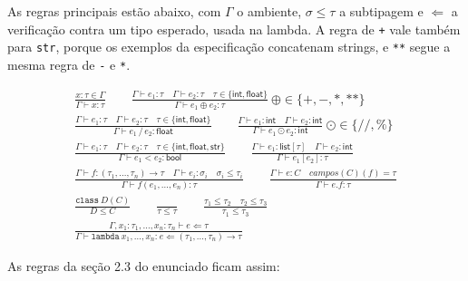 \documentclass[12pt,a4paper]{article}
\newcommand{\ty}[1]{\mathsf{#1}}
\begin{document}
As regras principais estão abaixo, com $\Gamma$ o ambiente,
$\sigma \le \tau$ a subtipagem e $\Leftarrow$ a verificação contra um
tipo esperado, usada na lambda. A regra de \texttt{+} vale também para
\texttt{str}, porque os exemplos da especificação concatenam strings, e
\texttt{**} segue a mesma regra de \texttt{-} e \texttt{*}.

\begin{gather*}
\frac{x : \tau \in \Gamma}{\Gamma \vdash x : \tau}
\qquad
\frac{\Gamma \vdash e_1 : \tau \quad \Gamma \vdash e_2 : \tau \quad \tau \in \{\ty{int}, \ty{float}\}}
     {\Gamma \vdash e_1 \oplus e_2 : \tau}\ {\scriptstyle \oplus \in \{+,-,*,**\}}
\\[8pt]
\frac{\Gamma \vdash e_1 : \tau \quad \Gamma \vdash e_2 : \tau \quad \tau \in \{\ty{int}, \ty{float}\}}
     {\Gamma \vdash e_1 \,/\, e_2 : \ty{float}}
\qquad
\frac{\Gamma \vdash e_1 : \ty{int} \quad \Gamma \vdash e_2 : \ty{int}}
     {\Gamma \vdash e_1 \odot e_2 : \ty{int}}\ {\scriptstyle \odot \in \{//, \%\}}
\\[8pt]
\frac{\Gamma \vdash e_1 : \tau \quad \Gamma \vdash e_2 : \tau \quad \tau \in \{\ty{int}, \ty{float}, \ty{str}\}}
     {\Gamma \vdash e_1 < e_2 : \ty{bool}}
\qquad
\frac{\Gamma \vdash e_1 : \ty{list}[\tau] \quad \Gamma \vdash e_2 : \ty{int}}
     {\Gamma \vdash e_1[e_2] : \tau}
\\[8pt]
\frac{\Gamma \vdash f : (\tau_1, \ldots, \tau_n) \to \tau \quad \Gamma \vdash e_i : \sigma_i \quad \sigma_i \le \tau_i}
     {\Gamma \vdash f(e_1, \ldots, e_n) : \tau}
\qquad
\frac{\Gamma \vdash e : C \quad \mathit{campos}(C)(f) = \tau}
     {\Gamma \vdash e.f : \tau}
\\[8pt]
\frac{\texttt{class}\ D(C)}{D \le C}
\qquad
\frac{}{\tau \le \tau}
\qquad
\frac{\tau_1 \le \tau_2 \quad \tau_2 \le \tau_3}{\tau_1 \le \tau_3}
\\[8pt]
\frac{\Gamma, x_1 : \tau_1, \ldots, x_n : \tau_n \vdash e \Leftarrow \tau}
     {\Gamma \vdash \texttt{lambda}\ x_1, \ldots, x_n\texttt{:}\ e \Leftarrow (\tau_1, \ldots, \tau_n) \to \tau}
\end{gather*}

As regras da seção 2.3 do enunciado ficam assim:
\end{document}
